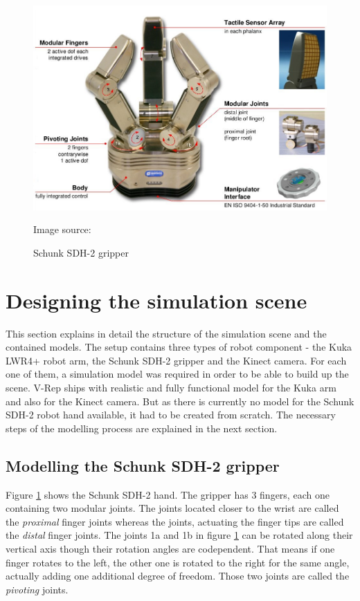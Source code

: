 \begin{figure}[ht]
	\centering
  	\includegraphics[width=1.0\textwidth]{images/sdh_sheet.jpg}
	\caption{Schunk SDH-2 gripper}
	{\scriptsize Image source: \cite{schunk2010}}
	\label{fig:sdh_sheet}
\end{figure}

\section{Designing the simulation scene}

This section explains in detail the structure of the simulation scene and the contained models. The setup contains three types of robot component - the Kuka LWR4+ robot arm, the Schunk SDH-2 gripper and the Kinect camera. For each one of them, a simulation model was required in order to be able to build up the scene. V-Rep ships with realistic and fully functional model for the Kuka arm and also for the Kinect camera. But as there is currently no model for the Schunk SDH-2 robot hand available, it had to be created from scratch. The necessary steps of the modelling process are explained in the next section.

\subsection{Modelling the Schunk SDH-2 gripper}

Figure \ref{fig:sdh_sheet} shows the Schunk SDH-2 hand. The gripper has 3 fingers, each one containing two modular joints. The joints located closer to the wrist are called the \emph{proximal} finger joints whereas the joints, actuating the finger tips are called the \emph{distal} finger joints. The joints 1a and 1b in figure \ref{fig:sdh_sheet} can be rotated along their vertical axis though their rotation angles are codependent. That means if one finger rotates to the left, the other one is rotated to the right for the same angle, actually adding one additional degree of freedom. Those two joints are called the \emph{pivoting} joints. \\

